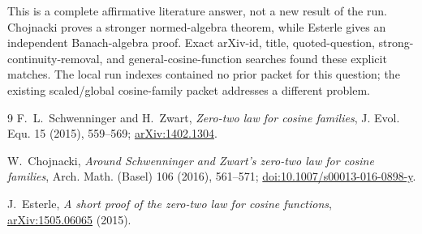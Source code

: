 \documentclass[10pt]{article}
\begin{document}
This is a complete affirmative literature answer, not a new result of the
run.  Chojnacki proves a stronger normed-algebra theorem, while Esterle gives
an independent Banach-algebra proof.  Exact arXiv-id, title, quoted-question,
strong-continuity-removal, and general-cosine-function searches found these
explicit matches.  The local run indexes contained no prior packet for this
question; the existing scaled/global cosine-family packet addresses a
different problem.

\begin{thebibliography}{9}
F.~L.~Schwenninger and H.~Zwart,
\emph{Zero-two law for cosine families},
J. Evol. Equ. 15 (2015), 559--569;
\href{https://arxiv.org/abs/1402.1304}{arXiv:1402.1304}.

W.~Chojnacki,
\emph{Around Schwenninger and Zwart's zero-two law for cosine families},
Arch. Math. (Basel) 106 (2016), 561--571;
\href{https://doi.org/10.1007/s00013-016-0898-y}{doi:10.1007/s00013-016-0898-y}.

J.~Esterle,
\emph{A short proof of the zero-two law for cosine functions},
\href{https://arxiv.org/abs/1505.06065}{arXiv:1505.06065} (2015).
\end{thebibliography}
\end{document}
